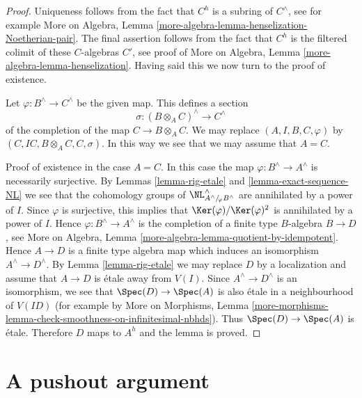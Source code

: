 \begin{proof}
Uniqueness follows from the fact that $C^h$ is a subring of
$C^\wedge$, see for example
More on Algebra, Lemma \ref{more-algebra-lemma-henselization-Noetherian-pair}.
The final assertion follows from the fact that $C^h$ is the filtered colimit
of these $C$-algebras $C'$, see proof of
More on Algebra, Lemma \ref{more-algebra-lemma-henselization}.
Having said this we now turn to the proof of existence.

\medskip\noindent
Let $\varphi : B^\wedge \to C^\wedge$ be the given map.
This defines a section
$$
\sigma : (B \otimes_A C)^\wedge \longrightarrow C^\wedge
$$
of the completion of the map $C \to B \otimes_A C$. We may
replace $(A, I, B, C, \varphi)$ by $(C, IC, B \otimes_A C, C, \sigma)$.
In this way we see that we may assume that $A = C$.

\medskip\noindent
Proof of existence in the case $A = C$. In this case the map
$\varphi : B^\wedge \to A^\wedge$ is necessarily surjective.
By Lemmas \ref{lemma-rig-etale} and \ref{lemma-exact-sequence-NL}
we see that the cohomology groups of
$\NL_{A^\wedge/\!_\varphi B^\wedge}^\wedge$
are annihilated by a power of $I$. Since $\varphi$ is surjective,
this implies that $\Ker(\varphi)/\Ker(\varphi)^2$ is annihilated
by a power of $I$. Hence $\varphi : B^\wedge \to A^\wedge$
is the completion of a finite type $B$-algebra $B \to D$, see
More on Algebra, Lemma \ref{more-algebra-lemma-quotient-by-idempotent}.
Hence $A \to D$ is a finite type algebra map which induces an isomorphism
$A^\wedge \to D^\wedge$. By
Lemma \ref{lemma-rig-etale} we may replace $D$ by a localization
and assume that $A \to D$ is \'etale away from $V(I)$.
Since $A^\wedge \to D^\wedge$ is an isomorphism, we see that
$\Spec(D) \to \Spec(A)$ is also \'etale in a neighbourhood of $V(ID)$
(for example by
More on Morphisms, Lemma
\ref{more-morphisms-lemma-check-smoothness-on-infinitesimal-nbhds}).
Thus $\Spec(D) \to \Spec(A)$ is \'etale. Therefore $D$ maps to
$A^h$ and the lemma is proved.
\end{proof}
















\section{A pushout argument}
\label{section-approximation}

